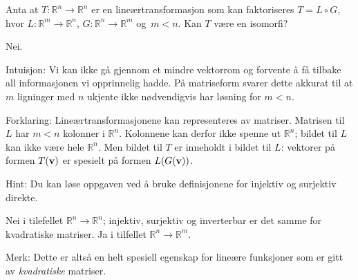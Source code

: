 \begin{oppgave}
Anta at $T:\mathbb{R}^n\rightarrow \mathbb{R}^n$ er en lineærtransformasjon som kan faktoriseres $T=L \circ G$, hvor $L:\mathbb{R}^m\rightarrow \mathbb{R}^n$, $G:\mathbb{R}^n\rightarrow \mathbb{R}^m$ og~$m<n$. Kan $T$ være en isomorfi?
\end{oppgave}

\begin{losning}
Nei.

\noindent
Intuisjon: Vi kan ikke gå gjennom et mindre vektorrom og forvente å få tilbake all informasjonen vi opprinnelig hadde. På matriseform svarer dette akkurat til at $m$ ligninger med $n$ ukjente ikke nødvendigvis har løsning for $m<n$.

\noindent
Forklaring: Lineærtransformasjonene kan representeres av matriser. Matrisen til $L$ har $m<n$ kolonner i $\mathbb{R}^n$. Kolonnene kan derfor ikke spenne ut $\mathbb{R}^n$; bildet til $L$ kan ikke være hele $\mathbb{R}^n$. Men bildet til $T$ er inneholdt i bildet til $L$: vektorer på formen $T(\mathbf{v})$ er spesielt på formen $L(G(\mathbf{v}))$.
\end{losning}


\begin{losning}

\begin{punkt}
Hint: Du kan løse oppgaven ved å bruke definisjonene for injektiv og surjektiv direkte.
\end{punkt}

\begin{punkt}
Nei i tilefellet $\mathbb{R}^n\rightarrow \mathbb{R}^n$; injektiv, surjektiv og inverterbar er det samme for kvadratiske matriser. Ja i tilfellet $\mathbb{R}^n\rightarrow \mathbb{R}^m$.


\noindent
Merk: Dette er altså en helt spesiell egenskap for lineære funksjoner som er gitt av \emph{kvadratiske} matriser.
\end{punkt}


\end{losning}





